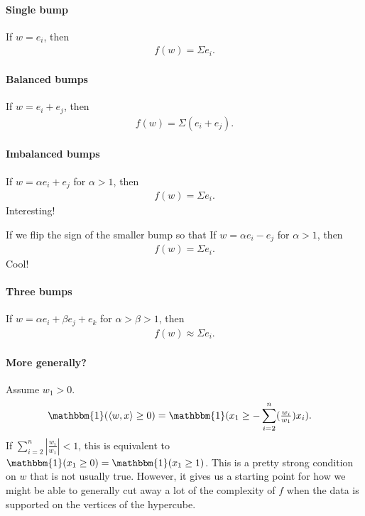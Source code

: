 \documentclass{article}
\begin{document}
\paragraph*{Single bump}
If $w = e_i$, then
\begin{align}
  f(w) = \Sigma e_i.
\end{align}

\paragraph*{Balanced bumps}
If $w = e_i + e_j$, then
\begin{align}
  f(w) = \Sigma (e_i + e_j).
\end{align}

\paragraph*{Imbalanced bumps}
If $w = \alpha e_i + e_j$ for $\alpha > 1$, then
\begin{align}
  f(w) = \Sigma e_i.
\end{align}
Interesting!

If we flip the sign of the smaller bump so that
If $w = \alpha e_i - e_j$ for $\alpha > 1$, then
\begin{align}
  f(w) = \Sigma e_i.
\end{align}
Cool!

\paragraph*{Three bumps}
If $w = \alpha e_i + \beta e_j + e_k$ for $\alpha > \beta > 1$, then
\begin{align}
  f(w) \approx \Sigma e_i.
\end{align}

\paragraph*{More generally?}
Assume $w_1 > 0$.
\begin{align*}
  \mathbbm{1}(\langle w, x \rangle \geq 0)
  &= \mathbbm{1}( x_1 \geq - \sum_{i=2}^{n} ( \tfrac{w_i}{w_1} ) x_i ).
\end{align*}
If $\sum_{i=2}^{n} | \tfrac{w_i}{w_1} | < 1$, this is equivalent to $\mathbbm{1}(x_1 \geq 0) = \mathbbm{1}(x_1 \geq 1)$.
This is a pretty strong condition on $w$ that is not usually true.
However, it gives us a starting point for how we might be able to generally cut away a lot of the complexity of $f$ when the data is supported on the vertices of the hypercube.
\end{document}
